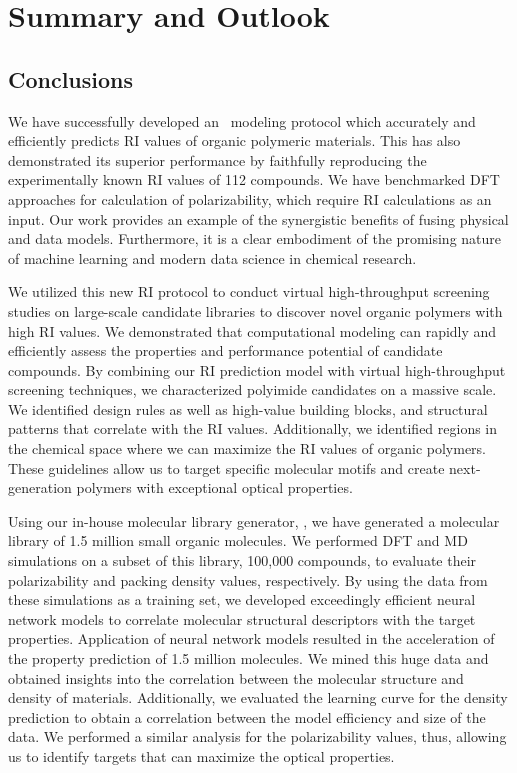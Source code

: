 \chapter{Summary and Outlook}

\section{Conclusions}

We have successfully developed an \insilico\ modeling protocol which accurately and efficiently predicts RI values of organic polymeric materials. This has also demonstrated its superior performance by faithfully reproducing the experimentally known RI values of 112 compounds. We have benchmarked DFT approaches for calculation of polarizability, which require RI calculations as an input. Our work provides an example of the synergistic benefits of fusing physical and data models. Furthermore, it is a clear embodiment of the promising nature of machine learning and modern data science in chemical research.

We utilized this new RI protocol to conduct virtual high-throughput screening studies on large-scale candidate libraries to discover novel organic polymers with high RI values. We demonstrated that computational modeling can rapidly and efficiently assess the properties and performance potential of candidate compounds. By combining our RI prediction model with virtual high-throughput screening techniques, we characterized polyimide candidates on a massive scale. We identified design rules as well as high-value building blocks, and structural patterns that correlate with the RI values. Additionally, we identified regions in the chemical space where we can maximize the RI values of organic polymers. These guidelines allow us to target specific molecular motifs and create next-generation polymers with exceptional optical properties. 

Using our in-house molecular library generator, \chemlg, we have generated a molecular library of 1.5 million small organic molecules. We performed DFT and MD simulations on a subset of this library, 100,000 compounds, to evaluate their polarizability and packing density values, respectively. By using the data from these simulations as a training set, we developed exceedingly efficient neural network models to correlate molecular structural descriptors with the target properties. Application of neural network models resulted in the acceleration of the property prediction of 1.5 million molecules. We mined this huge data and obtained insights into the correlation between the molecular structure and density of materials. Additionally, we evaluated the learning curve for the density prediction to obtain a correlation between the model efficiency and size of the data. We performed a similar analysis for the polarizability values, thus, allowing us to identify targets that can maximize the optical properties. 

